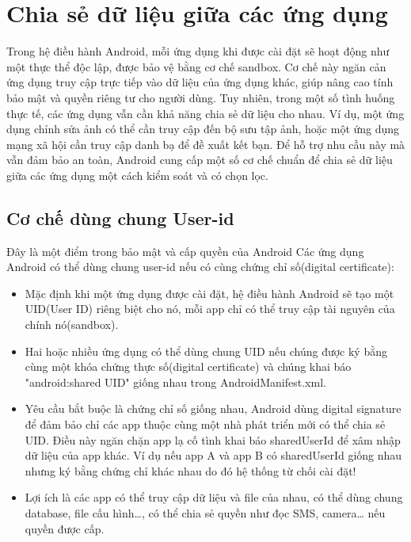 \section{Chia sẻ dữ liệu giữa các ứng dụng}

  Trong hệ điều hành Android, mỗi ứng dụng khi được cài đặt sẽ hoạt động như một thực thể độc lập, được bảo vệ bằng cơ chế sandbox. Cơ chế này ngăn cản ứng dụng truy cập trực tiếp vào dữ liệu của ứng dụng khác, giúp nâng cao tính bảo mật và quyền riêng tư cho người dùng. Tuy nhiên, trong một số tình huống thực tế, các ứng dụng vẫn cần khả năng chia sẻ dữ liệu cho nhau. Ví dụ, một ứng dụng chỉnh sửa ảnh có thể cần truy cập đến bộ sưu tập ảnh, hoặc một ứng dụng mạng xã hội cần truy cập danh bạ để đề xuất kết bạn. Để hỗ trợ nhu cầu này mà vẫn đảm bảo an toàn, Android cung cấp một số cơ chế chuẩn để chia sẻ dữ liệu giữa các ứng dụng một cách kiểm soát và có chọn lọc.

\subsection{Cơ chế dùng chung User-id}
\renewcommand{\labelitemi}{--}    
        Đây là một điểm trong bảo mật và cấp quyền của Android Các ứng dụng Android có thể dùng chung user-id nếu có cùng chứng chỉ số(digital certificate):
        \setlength{\leftmargini}{1.5cm}
        \begin{itemize}
            \item Mặc định khi một ứng dụng được cài đặt, hệ điều hành Android sẽ tạo một UID(User ID) riêng biệt cho nó, mỗi app chỉ có thể truy cập tài nguyên của chính nó(sandbox).
            \item Hai hoặc nhiều ứng dụng có thể dùng chung UID nếu chúng được ký bằng cùng một khóa chứng thực số(digital certificate) và chúng khai báo "android:shared UID" giống nhau trong AndroidManifest.xml.
            \item Yêu cầu bắt buộc là chứng chỉ số giống nhau, Android dùng digital signature để đảm bảo chỉ các app thuộc cùng một nhà phát triển mới có thể chia sẻ UID. Điều này ngăn chặn app lạ cố tình khai báo sharedUserId để xâm nhập dữ liệu của app khác.
            Ví dụ nếu app A và app B có sharedUserId giống nhau nhưng ký bằng chứng chỉ khác nhau do đó hệ thống từ chối cài đặt!
            \item Lợi ích là các app có thể truy cập dữ liệu và file của nhau, có thể dùng chung database, file cấu hình…, có thể chia sẻ quyền như đọc SMS, camera… nếu quyền được cấp.
        \end{itemize}
